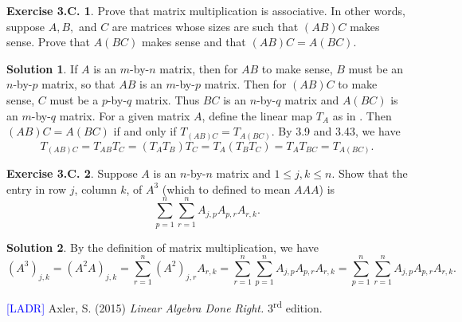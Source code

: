 \documentclass[12pt]{article}
\theoremstyle{definition}
\theoremstyle{exercise}
\newtheorem{exercise}{Exercise 3.C.}
\theoremstyle{solution}
\newtheorem*{solution}{Solution}
\newcommand{\ts}{\textsuperscript}
\begin{document}
\begin{exercise}
\label{ex:14}
    Prove that matrix multiplication is associative. In other words, suppose \( A, B, \) and \( C \) are matrices whose sizes are such that \( (AB)C \) makes sense. Prove that \( A(BC) \) makes sense and that \( (AB)C = A(BC) \).
\end{exercise}

\begin{solution}
    If \( A \) is an \(m\)-by-\(n\) matrix, then for \( AB \) to make sense, \( B \) must be an \(n\)-by-\(p\) matrix, so that \( AB \) is an \(m\)-by-\(p\) matrix. Then for \( (AB)C \) to make sense, \( C \) must be a \(p\)-by-\(q\) matrix. Thus \( BC \) is an \(n\)-by-\(q\) matrix and \( A(BC) \) is an \(m\)-by-\(q\) matrix. For a given matrix \( A \), define the linear map \( T_A \) as in . Then \( (AB)C = A(BC) \) if and only if \( T_{(AB)C} = T_{A(BC)} \). By 3.9 and 3.43, we have
    \[
        T_{(AB)C} = T_{AB} T_C = (T_A T_B) T_C = T_A (T_B T_C) = T_A T_{BC} = T_{A(BC)}.
    \]
\end{solution}

\begin{exercise}
\label{ex:15}
    Suppose \( A \) is an \(n\)-by-\(n\) matrix and \( 1 \leq j, k \leq n \). Show that the entry in row \( j \), column \( k \), of \( A^3 \) (which to defined to mean \( AAA \)) is
    \[
        \sum_{p=1}^n \sum_{r=1}^n A_{j,p} A_{p,r} A_{r,k}.
    \]
\end{exercise}

\begin{solution}
    By the definition of matrix multiplication, we have
    \[
        (A^3)_{j,k} = (A^2 A)_{j,k} = \sum_{r=1}^n (A^2)_{j,r} A_{r,k} = \sum_{r=1}^n \sum_{p=1}^n A_{j,p} A_{p,r} A_{r,k} = \sum_{p=1}^n \sum_{r=1}^n A_{j,p} A_{p,r} A_{r,k}.
    \]
\end{solution}

\noindent \hrulefill

\noindent \hypertarget{ladr}{\textcolor{blue}{[LADR]} Axler, S. (2015) \textit{Linear Algebra Done Right.} 3\ts{rd} edition.}
\end{document}
